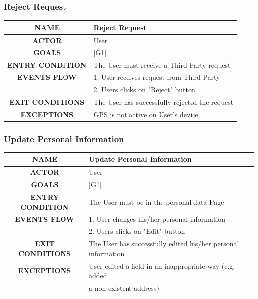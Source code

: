 \documentclass[12pt,a4paper]{article}
\begin{document}
	\subsubsection{Reject Request}
	\begin{center}
		\begin{tabular}{| c | l |}
			\hline
			\textbf{NAME} & Reject Request \\
			\hline
			\textbf{ACTOR} & User \\
			\hline
			\textbf{GOALS} & [G1] \\
			\hline
			\textbf{ENTRY CONDITION} & The User must receive a Third Party request \\ \hline
			\textbf{EVENTS FLOW}  &
			1. User receives request from Third Party\\
			&2. Users clicks on "Reject" button\\
			\hline
			\textbf{EXIT CONDITIONS}  & The User has successfully rejected the request \\ \hline
			\textbf{EXCEPTIONS} & 
			GPS is not active on User's device\\
			\hline
		\end{tabular}
	\end{center}

	\subsubsection{Update Personal Information}
	\begin{center}
		\begin{tabular}{| c | l |}
			\hline
			\textbf{NAME} & Update Personal Information \\
			\hline
			\textbf{ACTOR} & User \\
			\hline
			\textbf{GOALS} & [G1] \\
			\hline
			\textbf{ENTRY CONDITION} & The User must be in the personal data Page \\ \hline
			\textbf{EVENTS FLOW}  &
			1. User changes his/her personal information\\
			&2. Users clicks on "Edit" button\\
			\hline
			\textbf{EXIT CONDITIONS}  & The User has successfully edited his/her personal information \\ \hline
			\textbf{EXCEPTIONS} & 
			User edited a field in an inappropriate way (e.g. added \\
			&a non-existent address)\\
			\hline
		\end{tabular}
	\end{center}
\end{document}

